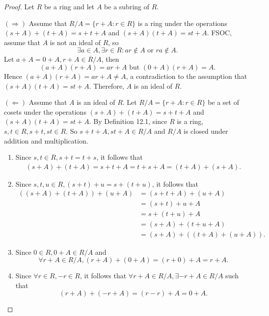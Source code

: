 \documentclass{article}
\theoremstyle{definition}
\begin{document}
\begin{proof}
     Let $R$ be a ring and let $A$ be a subring of $R$.
     
     $(\Rightarrow)$ Assume that $R/A=\{r+A:r\in R\}$ is a ring under the operations $(s+A)+(t+A)=s+t+A$ and $(s+A)(t+A)=st+A$. FSOC, assume that $A$ is not an ideal of $R$, so 
     \begin{equation*}
         \exists a \in A, \exists r \in R: ar\notin A \text{ or } ra\notin A.
     \end{equation*}
     Let $a+A=0+A,r+A\in R/A$, then
     \begin{equation*}
         (a+A)(r+A)=ar+A \text{ but } (0+A)(r+A)=A.
     \end{equation*}
     Hence $(a+A)(r+A)=ar+A\neq A$, a contradiction to the assumption that $(s+A)(t+A)=st+A$. Therefore, $A$ is an ideal of $R$.
     
     $(\Leftarrow)$ Assume that $A$ is an ideal of $R$. Let $R/A=\{r+A:r\in R\}$ be a set of cosets under the operations $(s+A)+(t+A)=s+t+A$ and $(s+A)(t+A)=st+A$. By Definition 12.1, since $R$ is a ring, $s,t \in R, s+t, st\in R$. So
     $s+t+A,st+A\in R/A$ and $R/A$ is closed under addition and multiplication.
     \begin{enumerate}
         \item Since $s,t\in R, s+t=t+s$, it follows that
         \begin{align*}
             (s+A)+(t+A)=s+t+A=t+s+A=(t+A)+(s+A).
         \end{align*}
         
         \item Since $s,t,u\in R, (s+t)+u=s+(t+u)$, it follows that
         \begin{align*}
             ((s+A)+(t+A))+(u+A) &= (s+t+A)+(u+A) \\
             &= (s+t)+u+A \\
             &= s+(t+u)+A \\
             &= (s+A)+(t+u+A)\\
             &= (s+A)+((t+A)+(u+A)).
         \end{align*}
         
         \item Since $0\in R, 0+A \in R/A$ and 
         \begin{equation*}
             \forall r+A \in R/A, (r+A)+(0+A)=(r+0)+A=r+A.
         \end{equation*}
         
         \item Since $\forall r\in R, -r\in R$, it follows that $\forall r+A \in R/A, \exists -r+A \in R/A$ such that
         \begin{equation*}
             (r+A)+(-r+A)=(r-r)+A=0+A.
         \end{equation*}
         

\end{enumerate}
\end{proof}
\end{document}
